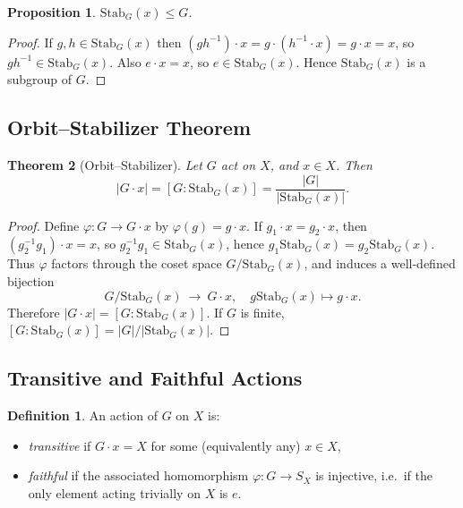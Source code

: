 \documentclass[12pt]{article}
\newtheorem{theorem}{Theorem}
\newtheorem{proposition}[theorem]{Proposition}
\theoremstyle{definition}
\newtheorem{definition}{Definition}
\begin{document}
\begin{proposition}
$\mathrm{Stab}_G(x)\le G$.
\end{proposition}

\begin{proof}
If $g,h\in\mathrm{Stab}_G(x)$ then $(gh^{-1})\cdot x=g\cdot(h^{-1}\cdot x)=g\cdot x=x$,
so $gh^{-1}\in \mathrm{Stab}_G(x)$. Also $e\cdot x=x$, so $e\in \mathrm{Stab}_G(x)$.
Hence $\mathrm{Stab}_G(x)$ is a subgroup of $G$.
\end{proof}

\subsection*{Orbit–Stabilizer Theorem}

\begin{theorem}[Orbit–Stabilizer]
Let $G$ act on $X$, and $x\in X$. Then
\[
|G\cdot x| = [G:\mathrm{Stab}_G(x)] = \frac{|G|}{|\mathrm{Stab}_G(x)|}.
\]
\end{theorem}

\begin{proof}
Define $\varphi:G\to G\cdot x$ by $\varphi(g)=g\cdot x$.  
If $g_1\cdot x=g_2\cdot x$, then $(g_2^{-1}g_1)\cdot x=x$, so $g_2^{-1}g_1\in\mathrm{Stab}_G(x)$,
hence $g_1\mathrm{Stab}_G(x)=g_2\mathrm{Stab}_G(x)$. Thus $\varphi$ factors through the coset space $G/\mathrm{Stab}_G(x)$,
and induces a well-defined bijection
\[
G/\mathrm{Stab}_G(x) \ \longrightarrow\ G\cdot x,\quad g\mathrm{Stab}_G(x)\mapsto g\cdot x.
\]
Therefore $|G\cdot x|=[G:\mathrm{Stab}_G(x)]$. If $G$ is finite, $[G:\mathrm{Stab}_G(x)]=|G|/|\mathrm{Stab}_G(x)|$.
\end{proof}

\subsection*{Transitive and Faithful Actions}

\begin{definition}
An action of $G$ on $X$ is:
\begin{itemize}
    \item \emph{transitive} if $G\cdot x=X$ for some (equivalently any) $x\in X$,
    \item \emph{faithful} if the associated homomorphism $\varphi:G\to S_X$ is injective, i.e.\
          if the only element acting trivially on $X$ is $e$.
\end{itemize}
\end{definition}
\end{document}
